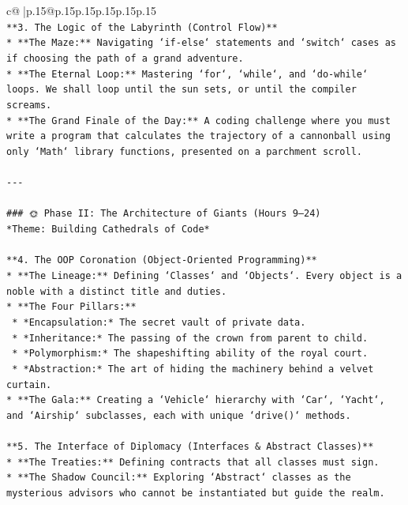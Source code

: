 \documentclass{article}
\begin{document}
{\begin{supertabular}{c@{$\;$}|p{.15\linewidth}@{}p{.15\linewidth}p{.15\linewidth}p{.15\linewidth}p{.15\linewidth}p{.15\linewidth}}
{{{\\ 
\texttt{**3. The Logic of the Labyrinth (Control Flow)**} \\
\texttt{*   **The Maze:** Navigating `if{-}else` statements and `switch` cases as if choosing the path of a grand adventure.} \\
\texttt{*   **The Eternal Loop:** Mastering `for`, `while`, and `do{-}while` loops. We shall loop until the sun sets, or until the compiler screams.} \\
\texttt{*   **The Grand Finale of the Day:** A coding challenge where you must write a program that calculates the trajectory of a cannonball using only `Math` library functions, presented on a parchment scroll.} \\
\\ 
\texttt{{-}{-}{-}} \\
\\ 
\texttt{\#\#\# 🌞 Phase II: The Architecture of Giants (Hours 9–24)} \\
\texttt{*Theme: Building Cathedrals of Code*} \\
\\ 
\texttt{**4. The OOP Coronation (Object{-}Oriented Programming)**} \\
\texttt{*   **The Lineage:** Defining `Classes` and `Objects`. Every object is a noble with a distinct title and duties.} \\
\texttt{*   **The Four Pillars:**} \\
\texttt{    *   *Encapsulation:* The secret vault of private data.} \\
\texttt{    *   *Inheritance:* The passing of the crown from parent to child.} \\
\texttt{    *   *Polymorphism:* The shapeshifting ability of the royal court.} \\
\texttt{    *   *Abstraction:* The art of hiding the machinery behind a velvet curtain.} \\
\texttt{*   **The Gala:** Creating a `Vehicle` hierarchy with `Car`, `Yacht`, and `Airship` subclasses, each with unique `drive()` methods.} \\
\\ 
\texttt{**5. The Interface of Diplomacy (Interfaces \& Abstract Classes)**} \\
\texttt{*   **The Treaties:** Defining contracts that all classes must sign.} \\
\texttt{*   **The Shadow Council:** Exploring `Abstract` classes as the mysterious advisors who cannot be instantiated but guide the realm.} \\
}}}
\end{supertabular}}
\end{document}
